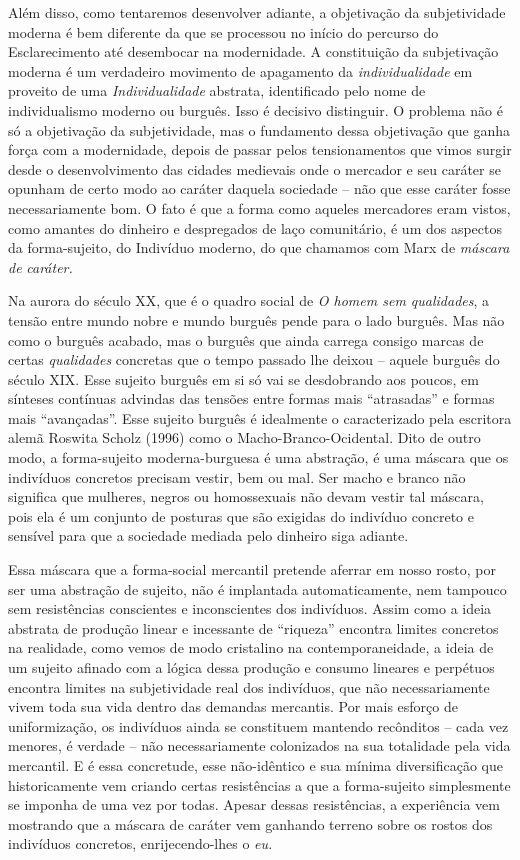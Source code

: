 Além disso, como tentaremos desenvolver adiante, a objetivação da
subjetividade moderna é bem diferente da que se processou no início do
percurso do Esclarecimento até desembocar na modernidade. A constituição
da subjetivação moderna é um verdadeiro movimento de apagamento da
\emph{individualidade} em proveito de uma \emph{Individualidade}
abstrata, identificado pelo nome de individualismo moderno ou burguês.
Isso é decisivo distinguir. O problema não é só a objetivação da
subjetividade, mas o fundamento dessa objetivação que ganha força com a
modernidade, depois de passar pelos tensionamentos que vimos surgir
desde o desenvolvimento das cidades medievais onde o mercador e seu
caráter se opunham de certo modo ao caráter daquela sociedade -- não que
esse caráter fosse necessariamente bom. O fato é que a forma como
aqueles mercadores eram vistos, como amantes do dinheiro e despregados
de laço comunitário, é um dos aspectos da forma-sujeito, do Indivíduo
moderno, do que chamamos com Marx de \emph{máscara} \emph{de}
\emph{caráter.}

Na aurora do século XX, que é o quadro social de \emph{O homem sem
qualidades}, a tensão entre mundo nobre e mundo burguês pende para o
lado burguês. Mas não como o burguês acabado, mas o burguês que ainda
carrega consigo marcas de certas \emph{qualidades} concretas que o tempo
passado lhe deixou -- aquele burguês do século XIX. Esse sujeito burguês
em si só vai se desdobrando aos poucos, em sínteses contínuas advindas
das tensões entre formas mais ``atrasadas'' e formas mais ``avançadas''.
Esse sujeito burguês é idealmente o caracterizado pela escritora alemã
Roswita Scholz (1996) como o Macho-Branco-Ocidental. Dito de outro modo,
a forma-sujeito moderna-burguesa é uma abstração, é uma máscara que os
indivíduos concretos precisam vestir, bem ou mal. Ser macho e branco não
significa que mulheres, negros ou homossexuais não devam vestir tal
máscara, pois ela é um conjunto de posturas que são exigidas do
indivíduo concreto e sensível para que a sociedade mediada pelo dinheiro
siga adiante.

Essa máscara que a forma-social mercantil pretende aferrar em nosso
rosto, por ser uma abstração de sujeito, não é implantada
automaticamente, nem tampouco sem resistências conscientes e
inconscientes dos indivíduos. Assim como a ideia abstrata de produção
linear e incessante de ``riqueza'' encontra limites concretos na
realidade, como vemos de modo cristalino na contemporaneidade, a ideia
de um sujeito afinado com a lógica dessa produção e consumo lineares e
perpétuos encontra limites na subjetividade real dos indivíduos, que não
necessariamente vivem toda sua vida dentro das demandas mercantis. Por
mais esforço de uniformização, os indivíduos ainda se constituem
mantendo recônditos -- cada vez menores, é verdade -- não
necessariamente colonizados na sua totalidade pela vida mercantil. E é
essa concretude, esse não-idêntico e sua mínima diversificação que
historicamente vem criando certas resistências a que a forma-sujeito
simplesmente se imponha de uma vez por todas. Apesar dessas
resistências, a experiência vem mostrando que a máscara de caráter vem
ganhando terreno sobre os rostos dos indivíduos concretos,
enrijecendo-lhes o \emph{eu.}

